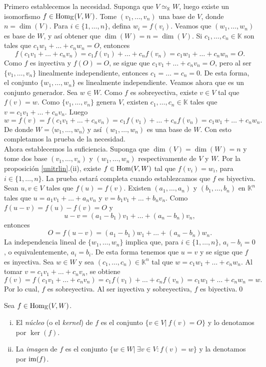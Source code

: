 \dem Primero establecemos la necesidad. Suponga que $V\simeq_{\mathbb{K}} W$, luego existe un isomorfismo $f\in\operatorname{Hom}_{\mathbb{K}}(V,W)$. Tome $(v_1,\ldots,v_n)$ una base de $V$, donde $n=\dim(V)$. Para $i\in\{1,\ldots,n\}$, defina $w_i=f(v_i)$. Veamos que $(w_1,\ldots,w_n)$ es base de $W$, y así obtener que $\dim(W)=n=\dim(V)$. Si $c_1,\ldots,c_n\in \mathbb{K}$ son tales que $c_1w_1+\ldots+c_nw_n=O$, entonces
\[
f(c_1v_1+\ldots+c_nv_n)=c_1f(v_1)+\ldots+c_nf(v_n)=c_1w_1+\ldots+c_nw_n=O.
\]
Como $f$ es inyectiva y $f(O)=O$, se sigue que $c_1v_1+\ldots+c_nv_n=O$, pero al ser $\{v_1,\ldots,v_n\}$ linealmente independiente, entonces $c_1=\ldots=c_n=0$. De esta forma, el conjunto $\{w_1,\ldots,w_n\}$ es linealmente independiente. Veamos ahora que es un conjunto generador. Sea $w\in W$. Como $f$ es sobreyectiva, existe $v\in V$ tal que $f(v)=w$. Como $\{v_1,\ldots,v_n\}$ genera $V$, existen $c_1,\ldots,c_n\in \mathbb{K}$ tales que $v=c_1v_1+\ldots+c_nv_n$. Luego
\[
w=f(v)=f(c_1v_1+\ldots+c_nv_n)=c_1f(v_1)+\ldots+c_nf(v_n)=c_1w_1+\ldots+c_nw_n.
\]
De donde $W=\langle w_1,\ldots,w_n\rangle$ y as\'i $(w_1,\ldots,w_n)$ es una base de $W$. Con esto completamos la prueba de la necesidad.\\
Ahora establecemos la suficiencia. Suponga que $\dim(V)=\dim(W)=n$ y tome dos base $(v_1,\ldots,v_n)$ y $(w_1,\ldots,w_n)$ respectivamente de $V$ y $W$. Por la proposici\'on \ref{unitrlin}.(ii), existe $f\in\operatorname{Hom}(V,W)$ tal que $f(v_i)=w_i$, para $i\in\{1,\ldots,n\}$. La prueba estar\'a completa cuando establezcamos que $f$ es biyectiva. Sean $u,v\in V$ tales que $f(u)=f(v)$. Existen $(a_1,\ldots,a_n)$ y $(b_1,\ldots,b_n)$ en $\mathbb{K}^n$ tales que $u=a_1v_1+\ldots+a_nv_n$ y $v=b_1v_1+\ldots+b_nv_n$. Como $f(u-v)=f(u)-f(v)=O$ y
\[
u-v=(a_1-b_1)v_1+\ldots+(a_n-b_n)v_n,
\]
entonces
\[
O=f(u-v)=(a_1-b_1)w_1+\ldots+(a_n-b_n)w_n.
\]
La independencia lineal de $\{w_1,\ldots,w_n\}$ implica que, para $i\in\{1,\ldots,n\}$, $a_i-b_i=0$, o equivalentemente, $a_i=b_i$. De esta forma tenemos que $u=v$ y se sigue que $f$ es inyectiva. Sea $w\in W$ y sea $(c_1,\ldots, c_n)\in \mathbb{K}^n$ tal que $w=c_1w_1+\ldots+c_nw_n$. Al tomar $v=c_1v_1+\ldots+c_nv_n$, se obtiene
\[
f(v)=f(c_1v_1+\ldots+c_nv_n)=c_1f(v_1)+\ldots+c_nf(v_n)=c_1w_1+\ldots+c_nw_n=w.
\]
Por lo cual, $f$ es sobreyectiva. Al ser inyectiva y sobreyectiva, $f$ es biyectiva.\qed

\begin{defn}
Sea $f\in\operatorname{Hom}_{\mathbb{K}}(V,W)$.
\begin{enumerate}[(i)]
\item El \emph{n\'ucleo} (o el \emph{kernel}) de $f$ es el conjunto $\{v\in V|\ f(v)=O\}$ y lo denotamos por $\ker(f)$.
\item La \emph{imagen} de $f$ es el conjunto $\{w\in W|\ \exists v\in V: f(v)=w\}$ y la denotamos por
$\operatorname{im}(f)$.
\end{enumerate}
\end{defn}

